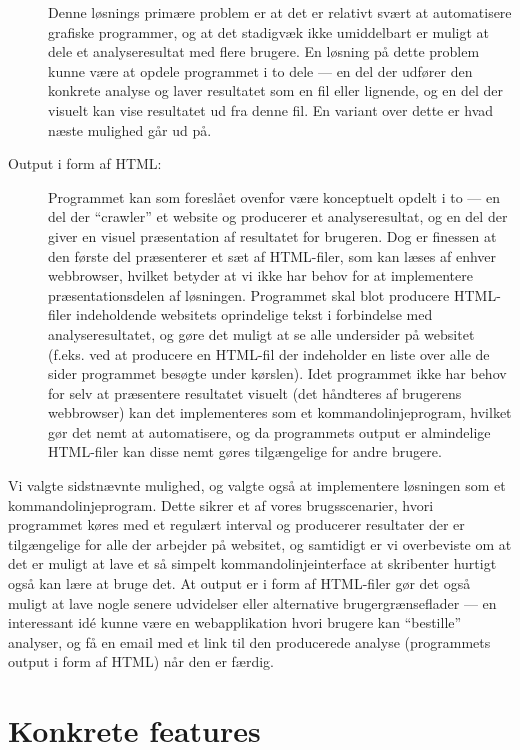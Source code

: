 \documentclass[a4paper,oneside]{memoir}
\begin{document}
\begin{description}
  Denne løsnings primære problem er at det er relativt svært at
  automatisere grafiske programmer, og at det stadigvæk ikke
  umiddelbart er muligt at dele et analyseresultat med flere
  brugere. En løsning på dette problem kunne være at opdele programmet
  i to dele --- en del der udfører den konkrete analyse og laver
  resultatet som en fil eller lignende, og en del der visuelt kan vise
  resultatet ud fra denne fil. En variant over dette er hvad næste
  mulighed går ud på.

\item[Output i form af HTML:]
  Programmet kan som foreslået ovenfor være konceptuelt opdelt i
  to --- en del der ``crawler'' et website og producerer et
  analyseresultat, og en del der giver en visuel præsentation af
  resultatet for brugeren. Dog er finessen at den første del
  præsenterer et sæt af HTML-filer, som kan læses af enhver
  webbrowser, hvilket betyder at vi ikke har behov for at implementere
  præsentationsdelen af løsningen. Programmet skal blot producere
  HTML-filer indeholdende websitets oprindelige tekst i forbindelse
  med analyseresultatet, og gøre det muligt at se alle undersider på
  websitet (f.eks. ved at producere en HTML-fil der indeholder en
  liste over alle de sider programmet besøgte under kørslen). Idet
  programmet ikke har behov for selv at præsentere resultatet visuelt
  (det håndteres af brugerens webbrowser) kan det implementeres som et
  kommandolinjeprogram, hvilket gør det nemt at automatisere, og da
  programmets output er almindelige HTML-filer kan disse nemt gøres
  tilgængelige for andre brugere.
\end{description}

Vi valgte sidstnævnte mulighed, og valgte også at implementere
løsningen som et kommandolinjeprogram. Dette sikrer et af vores
brugsscenarier, hvori programmet køres med et regulært interval og
producerer resultater der er tilgængelige for alle der arbejder på
websitet, og samtidigt er vi overbeviste om at det er muligt at lave
et så simpelt kommandolinjeinterface at skribenter hurtigt også kan
lære at bruge det. At output er i form af HTML-filer gør det også
muligt at lave nogle senere udvidelser eller alternative
brugergrænseflader --- en interessant idé kunne være en webapplikation
hvori brugere kan ``bestille'' analyser, og få en email med et link
til den producerede analyse (programmets output i form af HTML) når
den er færdig.

\section{Konkrete features}
\end{document}
